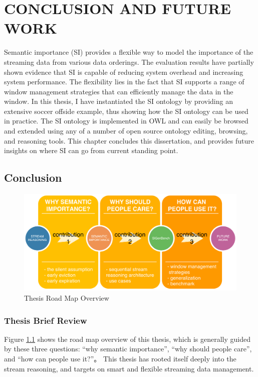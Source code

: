  
\chapter{CONCLUSION AND FUTURE WORK}
Semantic importance (SI) provides a flexible way to model the importance of the streaming data from various data orderings.
The evaluation results have partially shown evidence that SI is capable of reducing system overhead and increasing system performance. 
The flexibility lies in the fact that SI supports a range of window management strategies that can efficiently manage the data in the window. 
In this thesis, I have instantiated the SI ontology by providing an extensive soccer offside example, thus showing how the SI ontology can be used in practice.
The SI ontology is implemented in OWL and can easily be browsed and extended using any of a number of open source ontology editing, browsing, and reasoning tools.
This chapter concludes this dissertation, and provides future insights on where SI can go from current standing point. 
%
\section{Conclusion}

\begin{figure}[!htbp]
	\centering
    \includegraphics[width=5in]{img/7-trm.pdf}
    \caption{Thesis Road Map Overview}
    \label{fig:7-trm}
\end{figure}
%
\subsection{Thesis Brief Review}
Figure \ref{fig:7-trm} shows the road map overview of this thesis, which is generally guided by these three questions: 
``why semantic importance'', ``why should people care'', and ``how can people use it?''。
This thesis has rooted itself deeply into the stream reasoning, and targets on smart and flexible streaming data management. 


